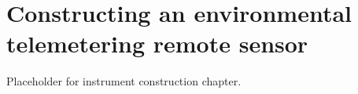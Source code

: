\setchapterpreamble[u]{\margintoc}
\chapter{Constructing an environmental telemetering remote sensor}

Placeholder for instrument construction chapter.